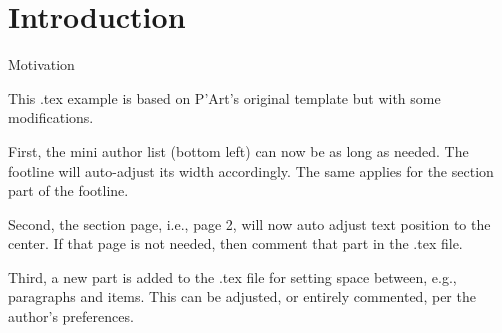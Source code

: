 \documentclass[11pt,aspectratio=169, c]{beamer} %
\begin{document}
	\section{Introduction}

	\begin{frame}{Motivation}
		
		This .tex example is based on P'Art's original template but with some modifications.
		
		First, the mini author list (bottom left) can now be as long as needed. The footline will auto-adjust its width accordingly. The same applies for the section part of the footline.
		
		Second, the section page, i.e., page 2, will now auto adjust text position to the center. If that page is not needed, then comment that part in the .tex file.
		
		Third, a new part is added to the .tex file for setting space between, e.g., paragraphs and items. This can be adjusted, or entirely commented, per the author's preferences.
		
	\end{frame}
\end{document}
